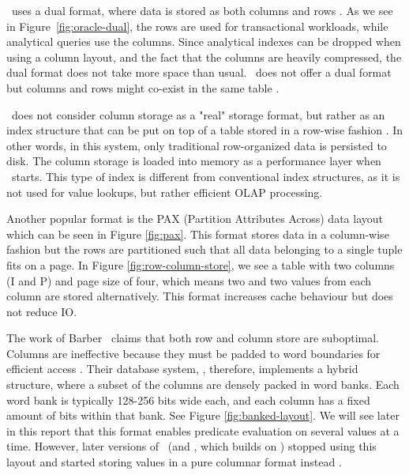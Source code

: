 
\oracle~uses a dual format, where data is stored as both columns and rows \cite{Lahiri2015-mz}. As we see in Figure~\ref{fig:oracle-dual}, the rows are used for transactional workloads, while analytical queries use the columns. Since analytical indexes can be dropped when using a column layout, and the fact that the columns are heavily compressed, the dual format does not take more space than usual. \ibm~does not offer a dual format but columns and rows might co-exist in the same table \cite{Raman2013-em}.

\mssql~does not consider column storage as a "real" storage format, but rather as an index structure that can be put on top of a table stored in a row-wise fashion \cite{noauthor_undated-vq}. In other words, in this system, only traditional row-organized data is persisted to disk. The column storage is loaded into memory as a performance layer when \mssql~starts. This type of index is different from conventional index structures, as it is not used for value lookups, but rather efficient OLAP processing.


Another popular format is the PAX (Partition Attributes Across) data layout \cite{Bjorklund2011-wh, Holloway2008-rr} which can be seen in Figure \ref{fig:pax}. This format stores data in a column-wise fashion but the rows are partitioned such that all data belonging to a single tuple fits on a page. In Figure \ref{fig:row-column-store}, we see a table with two columns (I and P) and page size of four, which means two and two values from each column are stored alternatively. This format increases cache behaviour but does not reduce IO.

The work of Barber \ea~claims that both row and column store are suboptimal. Columns are ineffective because they must be padded to word boundaries for efficient access \cite{Barber2012-xt}. Their database system, \blink, therefore, implements a hybrid structure, where a subset of the columns are densely packed in word banks. Each word bank is typically 128-256 bits wide each, and each column has a fixed amount of bits within that bank. See Figure \ref{fig:banked-layout}. We will see later in this report that this format enables predicate evaluation on several values at a time. However, later versions of \blink~(and \ibm, which builds on \blink) stopped using this layout and started storing values in a pure columnar format instead \cite{Raman2013-em}.

